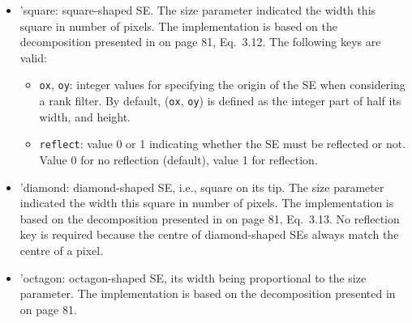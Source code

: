 \documentclass{book}
\renewcommand{\SE}{{SE}}
\newcommand{\oxkey}{\mbox{\tt ox}}
\newcommand{\oykey}{\mbox{\tt oy}}
\newcommand{\rankkey}{\mbox{\tt rank}}
\newcommand{\reflectkey}{\mbox{\tt reflect}}
\newcommand{\dxkey}{\mbox{\tt dx}}
\newcommand{\dykey}{\mbox{\tt dy}}
\newcommand{\originkey}{\mbox{\tt origin}}
\newcommand{\tikey}{\mbox{\tt ti}}
\newcommand{\periodkey}{\mbox{\tt period}}
\begin{document}
\begin{itemize}
\begin{itemize}
\item \dxkey, {\dykey} (required): integer values for specifying slope, the slope angle being equal to $\arctan(\dykey/\dxkey)$.
\item \originkey: integer value in the range $[0,size-1]$ for specifying the origin of the line segment.  By default, it is taken as the integer part of size/2.
\item \periodkey: integer value for indicating the 
\item \rankkey:  integer value indicating the rank when considering rank filters. It must be in the interval $[1,size]$.
\item \tikey:  value 0 or 1 indicating whether a translation-variant or invariant algorithm must be considered.  Value 0 for translation-variant (default), value 1 for translation-invariant.
\item \reflectkey:  value 0 or 1 indicating whether the line segment must be reflected or not.  Value 0 for no reflection (default), value 1 for reflection.
\end{itemize}

\item 'square: square-shaped {\SE}.  The size parameter indicated the width this square in number of pixels.  The implementation is based on the decomposition presented in \citep{soille2004sv} on page 81,  Eq.~3.12.  The following keys are valid:  
\begin{itemize}
\item \oxkey, \oykey: integer values for specifying the origin of the {\SE} when considering a rank filter.  By default,  (\oxkey, \oykey) is defined as the integer part of half its width, and height.
\item \reflectkey:  value 0 or 1 indicating whether the {\SE} must be reflected or not.  Value 0 for no reflection (default), value 1 for reflection.
\end{itemize}

\item 'diamond: diamond-shaped {\SE}, i.e., square on its tip.  The size parameter indicated the width this square in number of pixels.  The implementation is based on the decomposition presented in \citep{soille2004sv} on page 81,  Eq.~3.13.  No reflection key is required because the centre of diamond-shaped {\SE}s always match the centre of a pixel.

\item 'octagon: octagon-shaped {\SE}, its width being proportional to the size parameter.   The implementation is based on the decomposition presented in \citep{soille2004sv} on page 81.


\end{itemize}
\end{document}
